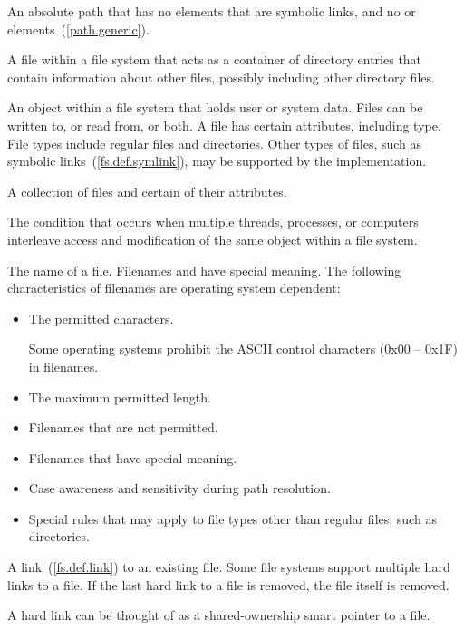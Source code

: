 An absolute path that has no elements that are symbolic links, and no  or
 elements~(\ref{path.generic}).

A file within a file system that acts as a container of directory entries
that contain information about
other files, possibly including other directory files.

An object within a file system that holds user or system data. Files can be written to, or read from, or both. A file
has certain attributes, including type. File types include regular files
and directories. Other types of files, such as symbolic links~(\ref{fs.def.symlink}),
may be supported by the implementation.

A collection of files and certain of their attributes.

The condition that occurs
when multiple threads, processes, or computers interleave access and
modification of
the same object within a file system.

The name of a file. Filenames  and  have special meaning. The
following characteristics of filenames are operating system dependent:
\begin{itemize}
\item The permitted characters. \begin{example} Some operating systems prohibit
      the ASCII control characters (0x00 -- 0x1F) in filenames. \end{example}
\item The maximum permitted length.
\item Filenames that are not permitted.
\item Filenames that have special meaning.
\item Case awareness and sensitivity during path resolution.
\item Special rules that may apply to file types other than regular
  files, such as directories.
\end{itemize}

A link~(\ref{fs.def.link}) to an existing file. Some
file systems support multiple hard links to a file. If the last hard link to a
file is removed, the file itself is removed.
\begin{note} A hard link can be thought of as a shared-ownership smart
pointer to a file.\end{note}

